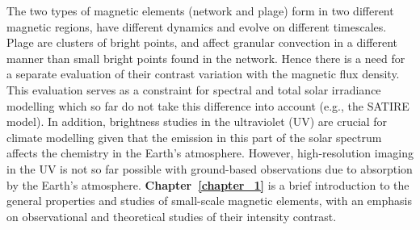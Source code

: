 \documentclass[goettingen, gauss, print]{thesis}
\begin{document}
The two types of magnetic elements (network and plage) form in two different magnetic regions, have different dynamics and evolve on different timescales. Plage are clusters of bright points, and affect granular convection in a different manner than small bright points found in the network. Hence there is a need for a separate evaluation of their contrast variation with the magnetic flux density. This evaluation serves as a constraint for spectral and total solar irradiance modelling which so far do not take this difference into account (e.g., the SATIRE model). In addition, brightness studies in the ultraviolet (UV) are crucial for climate modelling given that the emission in this part of the solar spectrum affects the chemistry in the Earth's atmosphere. However, high-resolution imaging in the UV is not so far possible with ground-based observations due to absorption by the Earth's atmosphere.
\textbf{Chapter~\ref{chapter_1}} is a brief introduction to the general properties and studies of small-scale magnetic elements, with an emphasis on observational and theoretical studies of their intensity contrast.\\
 

\end{document}
